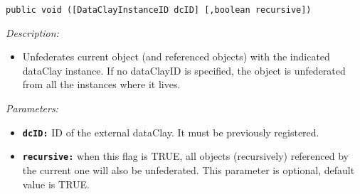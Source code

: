 \begin{dBox}

\texttt{public void ([DataClayInstanceID dcID] [,boolean recursive])}
\LINE

{\it Description:}

\begin{itemize}
  \item Unfederates current object (and referenced objects) with the indicated dataClay instance. If no dataClayID is specified, the object is unfederated from all the instances where it lives.
\end{itemize}

{\it Parameters:}

\begin{itemize}
  \item \texttt{\bfseries dcID:} ID of the external dataClay. It must be previously registered.
  \item \texttt{\bfseries recursive:} when this flag is TRUE, all objects (recursively) referenced by the current one will also be unfederated. This parameter is optional, default value is TRUE.
\end{itemize}

\end{dBox}

